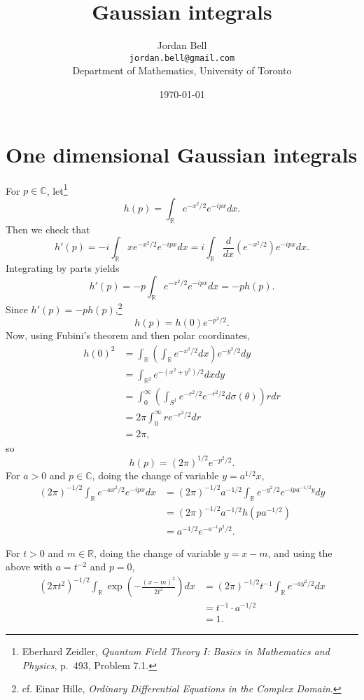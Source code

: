 \documentclass{article}
\theoremstyle{definition}
\begin{document}
\title{Gaussian integrals}
\author{Jordan Bell\\ \texttt{jordan.bell@gmail.com}\\Department of Mathematics, University of Toronto}
\date{\today}

\maketitle

\section{One dimensional Gaussian integrals}
For $p \in \mathbb{C}$, let\footnote{Eberhard Zeidler,
{\em Quantum Field Theory I: Basics in Mathematics and Physics},
p.~493, Problem 7.1.}
\[
h(p) = \int_{\mathbb{R}} e^{-x^2/2} e^{-ipx} dx.
\]
Then we check that
\[
h'(p) = -i \int_{\mathbb{R}} x e^{-x^2/2} e^{-ipx} dx = i\int_{\mathbb{R}} \frac{d}{dx} \left( e^{-x^2/2} \right)
e^{-ipx} dx.
\]
Integrating by parts yields
\[
h'(p) = -p \int_{\mathbb{R}} e^{-x^2/2} e^{-ipx} dx = -p h(p).
\]
Since $h'(p)=-p h(p)$,\footnote{cf. Einar Hille, {\em Ordinary Differential Equations in the Complex Domain}.}
\[
h(p) = h(0) e^{-p^2/2}.
\]
Now, using Fubini's theorem and then polar coordinates,
\begin{align*}
h(0)^2 &= \int_{\mathbb{R}} \left( \int_{\mathbb{R}} e^{-x^2/2} dx\right) e^{-y^2/2} dy\\
&=\int_{\mathbb{R}^2} e^{-(x^2+y^2)/2} dxdy\\
&=\int_0^\infty \left( \int_{S^1} e^{-r^2/2} e^{-r^2/2} d\sigma(\theta) \right) r dr\\
&=2\pi \int_0^\infty r e^{-r^2/2} dr\\
&=2\pi,
\end{align*}
so
\[
h(p) = (2\pi)^{1/2} e^{-p^2/2}.
\]
For $a>0$ and $p \in \mathbb{C}$, doing the change of variable $y = a^{1/2} x$,
\begin{align*}
(2\pi)^{-1/2} \int_{\mathbb{R}} e^{-ax^2/2} e^{-ipx} dx&=(2\pi)^{-1/2} a^{-1/2} \int_{\mathbb{R}} e^{-y^2/2} e^{-ipa^{-1/2} y} dy\\
&=(2\pi)^{-1/2} a^{-1/2} h(pa^{-1/2})\\
&=a^{-1/2} e^{-a^{-1} p^2 /2}.
\end{align*}

For $t>0$ and $m \in \mathbb{R}$, doing the change of variable $y=x-m$, and using the above with $a=t^{-2}$ and $p=0$,
\begin{align*}
(2\pi t^2)^{-1/2} \int_{\mathbb{R}} \exp\left(-\frac{(x-m)^2}{2t^2}\right) dx&=(2\pi)^{-1/2}  t^{-1} \int_{\mathbb{R}} e^{-ay^2/2} dx\\
&=t^{-1} \cdot a^{-1/2}\\
&=1.
\end{align*}
\end{document}
